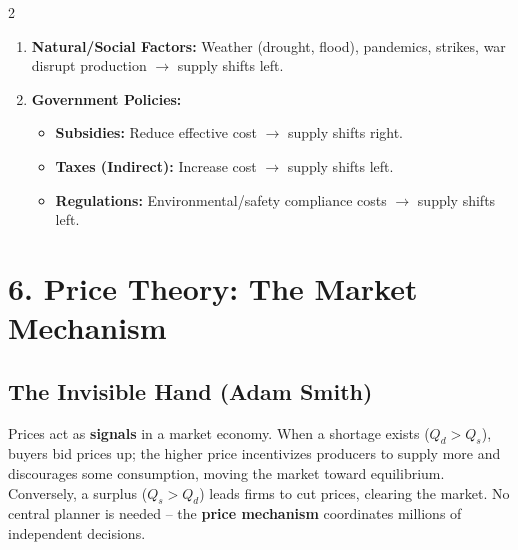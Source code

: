 \documentclass[10pt,a4paper]{article}
\begin{document}
\begin{multicols}{2}
\begin{enumerate}[leftmargin=*,nosep]
    \item \textbf{Natural/Social Factors:} Weather (drought, flood), pandemics, strikes, war disrupt production $\to$ supply shifts left.
    \item \textbf{Government Policies:}
    \begin{itemize}[nosep]
        \item \textbf{Subsidies:} Reduce effective cost $\to$ supply shifts right.
        \item \textbf{Taxes (Indirect):} Increase cost $\to$ supply shifts left.
        \item \textbf{Regulations:} Environmental/safety compliance costs $\to$ supply shifts left.
    \end{itemize}
\end{enumerate}

\section*{6. Price Theory: The Market Mechanism}

\subsection*{The Invisible Hand (Adam Smith)}
Prices act as \textbf{signals} in a market economy. When a shortage exists ($Q_d > Q_s$), buyers bid prices up; the higher price incentivizes producers to supply more and discourages some consumption, moving the market toward equilibrium. Conversely, a surplus ($Q_s > Q_d$) leads firms to cut prices, clearing the market. No central planner is needed -- the \textbf{price mechanism} coordinates millions of independent decisions.


\end{multicols}
\end{document}
